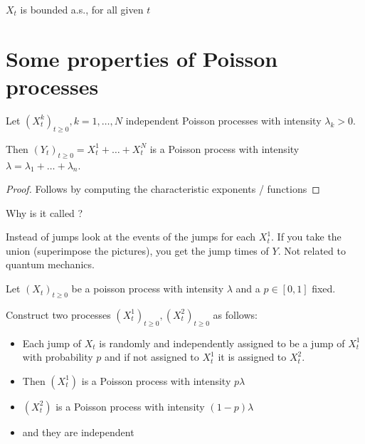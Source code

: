 $X_t$ is bounded a.s., for all given $t$

\section{Some properties of Poisson processes}

\begin{lemma}[Superposition]\label{lem:4.8}
    Let $(X_t^k)_{t\geq 0},k=1,\dots,N$ independent Poisson processes with intensity $\lambda_k>0$.

    Then $(Y_t)_{t\geq 0}=X_t^1+\dots+X_t^N$ is a Poisson process with intensity $\lambda=\lambda_1+\dots+\lambda_n$.
\end{lemma}

\begin{proof}
    Follows by computing the characteristic exponents / functions
\end{proof}

\begin{aremark}
    Why is it called ?

    Instead of jumps look at the events of the jumps for each $X_t^1$. If you take the union (superimpose the pictures), you get the jump times of $Y$. Not related to quantum mechanics.
\end{aremark} 

\begin{lemma}\label{lem:4.9}
    Let $(X_t)_{t\geq 0}$ be a poisson process with intensity $\lambda$ and a $p\in [0,1]$ fixed.

    Construct two processes $(X_t^1)_{t\geq 0},(X_t^2)_{t\geq 0}$ as follows:
    \begin{itemize}
        \item Each jump of $X_t$ is randomly and independently assigned to be a jump of $X_t^1$ with probability $p$ and if not assigned to $X_t^1$ it is assigned to $X_t^2$.
        \item Then $(X_t^1)$ is a Poisson process with intensity $p\lambda$
        \item $(X_t^2)$ is a Poisson process with intensity $(1-p)\lambda$
        \item and they are independent
    \end{itemize}
\end{lemma}

